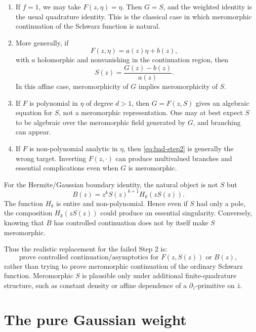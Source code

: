 \documentclass[11pt]{article}
\newcommand{\pbar}{\partial_{\bar z}}
\newcommand{\1}{\mathbf 1}
\begin{document}
\begin{enumerate}[label=(\roman*)]
\item If \(f=1\), we may take \(F(z,\eta)=\eta\). Then \(G=S\), and the weighted identity is
the usual quadrature identity. This is the classical case in which meromorphic
continuation of the Schwarz function is natural.

\item More generally, if
\[
  F(z,\eta)=a(z)\eta+b(z),
\]
with \(a\) holomorphic and nonvanishing in the continuation region, then
\[
  S(z)=\frac{G(z)-b(z)}{a(z)}.
\]
In this affine case, meromorphicity of \(G\) implies meromorphicity of \(S\).

\item If \(F\) is polynomial in \(\eta\) of degree \(d>1\), then \(G=F(z,S)\) gives an
algebraic equation for \(S\), not a meromorphic representation. One may at best expect
\(S\) to be algebraic over the meromorphic field generated by \(G\), and branching can
appear.

\item If \(F\) is non-polynomial analytic in \(\eta\), then \eqref{eq:bad-step2} is
generally the wrong target. Inverting \(F(z,\cdot)\) can produce multivalued branches and
essential complications even when \(G\) is meromorphic.
\end{enumerate}

For the Hermite/Gaussian boundary identity, the natural object is not \(S\) but
\begin{equation}\label{eq:weighted-hermite-object}
  B(z)=z^kS(z)^{k+1}H_k(zS(z)).
\end{equation}
The function \(H_k\) is entire and non-polynomial. Hence even if \(S\) had only a pole,
the composition \(H_k(zS(z))\) could produce an essential singularity. Conversely, knowing
that \(B\) has controlled continuation does not by itself make \(S\) meromorphic.

Thus the realistic replacement for the failed Step 2 is:
\[
  \text{prove controlled continuation/asymptotics for }F(z,S(z))
  \text{ or }B(z),
\]
rather than trying to prove meromorphic continuation of the ordinary Schwarz function.
Meromorphic \(S\) is plausible only under additional finite-quadrature structure, such as
constant density or affine dependence of a \(\pbar\)-primitive on \(\bar z\).

\section{The pure Gaussian weight}
\end{document}
